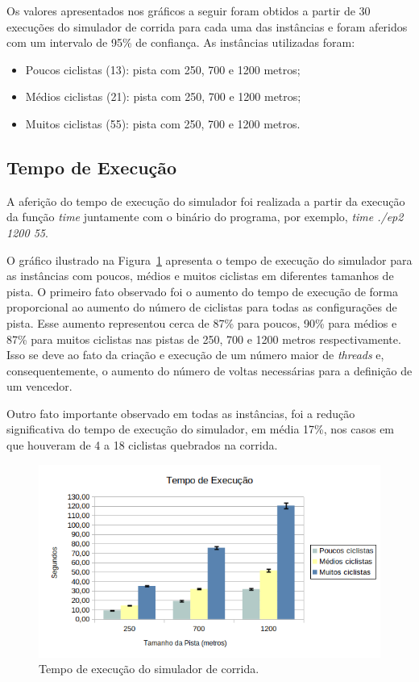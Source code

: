 \documentclass[12pt]{article}
\begin{document}
Os valores apresentados nos gráficos a seguir foram obtidos a partir de 30 execuções do simulador de corrida para cada uma das instâncias e foram aferidos com um intervalo de 95\% de confiança. As instâncias utilizadas foram:

\begin{itemize}
	\item Poucos ciclistas (13): pista com 250, 700 e 1200 metros;
	\item Médios ciclistas (21): pista com 250, 700 e 1200 metros;
	\item Muitos ciclistas (55): pista com 250, 700 e 1200 metros.
\end{itemize}

\subsection{Tempo de Execução}

A aferição do tempo de execução do simulador foi realizada a partir da execução da função \textit{time} juntamente com o binário do programa, por exemplo, \textit{time ./ep2 1200 55}.

O gráfico ilustrado na Figura~\ref{fig:time} apresenta o tempo de execução do simulador para as instâncias com poucos, médios e muitos ciclistas em diferentes tamanhos de pista. O primeiro fato observado foi o aumento do tempo de execução de forma proporcional ao aumento do número de ciclistas para todas as configurações de pista. Esse aumento representou cerca de 87\% para poucos, 90\% para médios e 87\% para muitos ciclistas nas pistas de 250, 700 e 1200 metros respectivamente. Isso se deve ao fato da criação e execução de um número maior de \textit{threads} e, consequentemente, o aumento do número de voltas necessárias para a definição de um vencedor.

Outro fato importante observado em todas as instâncias, foi a redução significativa do tempo de execução do simulador, em média 17\%, nos casos em que houveram de 4 a 18 ciclistas quebrados na corrida.

\begin{figure}[H]
	\centering
	\includegraphics[width=1\textwidth]{time.png}
	\caption{Tempo de execução do simulador de corrida.}
	\label{fig:time}
\end{figure}
\end{document}
